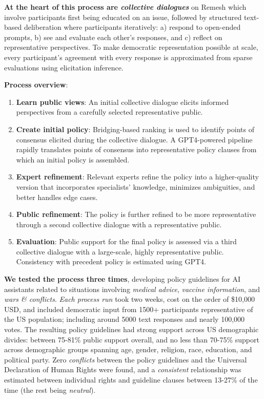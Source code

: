 \documentclass{article}
\begin{document}
\textbf{At the heart of this process are \emph{collective dialogues}} on Remesh which involve participants first being educated on an issue, followed by structured text-based deliberation where participants iteratively: a) respond to open-ended prompts, b) see and evaluate each other’s responses, and c) reflect on representative perspectives. To make democratic representation possible at scale, every participant's agreement with every response is approximated from sparse evaluations using elicitation inference.

\textbf{Process overview}:

\begin{enumerate}
    \item \textbf{Learn public views}: An initial collective dialogue elicits informed perspectives from a carefully selected representative public.
    \item \textbf{Create initial policy}: Bridging-based ranking is used to identify points of consensus elicited during the collective dialogue. A GPT4-powered pipeline rapidly translates points of consensus into representative policy clauses from which an initial policy is assembled. 
    \item \textbf{Expert refinement}: Relevant experts refine the policy into a higher-quality version that incorporates specialists' knowledge, minimizes ambiguities, and better handles edge cases.
    \item \textbf{Public refinement}: The policy is further refined to be more representative through a second collective dialogue with a representative public.
    \item \textbf{Evaluation}: Public support for the final policy is assessed via a third collective dialogue with a large-scale, highly representative public. Consistency with precedent policy is estimated using GPT4.
\end{enumerate}
 
 \textbf{We tested the process three times}, developing policy guidelines for AI assistants related to situations involving \emph{medical advice}, \emph{vaccine information}, and \emph{wars \& conflicts}. \emph{Each process run} took two weeks, cost on the order of \$10,000 USD, and included democratic input from 1500+ participants representative of the US population; including around 5000 text responses and nearly 100,000 votes. The resulting policy guidelines had strong support across US demographic divides: between 75-81\% public support overall, and no less than 70-75\% support across demographic groups spanning age, gender, religion, race, education, and political party. Zero \emph{conflicts} between the policy guidelines and the Universal Declaration of Human Rights were found, and a \emph{consistent} relationship was estimated between individual rights and guideline clauses between 13-27\% of the time (the rest being
\emph{neutral}). 
\end{document}
